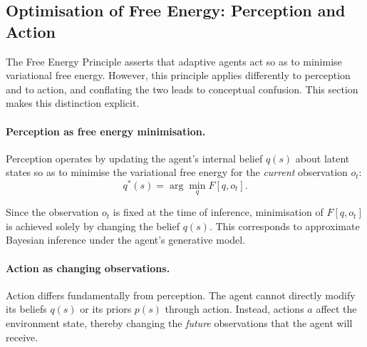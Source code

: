 \documentclass[a4paper, twoside]{article}
\begin{document}


\subsection{Optimisation of Free Energy: Perception and Action}

The Free Energy Principle asserts that adaptive agents act so as to minimise
variational free energy. However, this principle applies differently to
perception and to action, and conflating the two leads to conceptual confusion.
This section makes this distinction explicit.

\paragraph{Perception as free energy minimisation.}
Perception operates by updating the agent's internal belief $q(s)$ about latent
states so as to minimise the variational free energy for the \emph{current}
observation $o_t$:
\begin{equation}
q^\ast(s) = \arg\min_q F[q, o_t].
\end{equation}

Since the observation $o_t$ is fixed at the time of inference, minimisation of
$F[q,o_t]$ is achieved solely by changing the belief $q(s)$. This corresponds to
approximate Bayesian inference under the agent’s generative model.

\paragraph{Action as changing observations.}
Action differs fundamentally from perception. The agent cannot directly modify
its beliefs $q(s)$ or its priors $p(s)$ through action. Instead, actions $a$
affect the environment state, thereby changing the \emph{future} observations
that the agent will receive.
\end{document}

